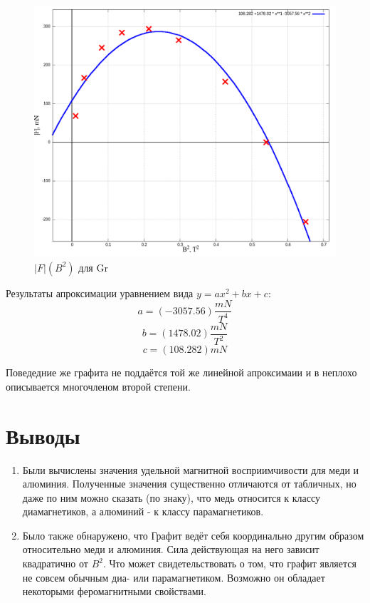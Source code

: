 \documentclass{article}
\begin{document}
    
    \begin{figure}[H]
        \centering
        \includegraphics[width=\textwidth]{Gr-comp.png}
        \caption{$|F|(B^2)$ для Gr}
    \end{figure}

    Результаты апроксимации уравнением вида \(y = ax^2 + bx + c\):
    \[ a = (-3057.56) \frac{mN}{T^4} \]
    \[ b = (1478.02) \frac{mN}{T^2} \]
    \[ c = (108.282) mN \]

    Поведедние же графита не поддаётся той же линейной апроксимаии и в неплохо описывается многочленом второй степени.

    \section {Выводы}
    \begin{enumerate}
        \item Были вычислены значения удельной магнитной восприимчивости для меди и алюминия.
    Полученные значения существенно отличаются от табличных, но даже по ним можно сказать (по знаку), что медь
    относится к классу диамагнетиков, а алюминий - к классу парамагнетиков.
        \item Было также обнаружено, что Графит ведёт себя координально другим образом относительно меди
    и алюминия. Сила действующая на него зависит квадратично от \(B^2\). Что может свидетельствовать о том,
    что графит является не совсем обычным диа- или парамагнетиком. Возможно он обладает некоторыми феромагнитными
    свойствами.

    \end{enumerate}
\end{document}
